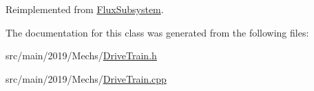 Reimplemented from \hyperlink{classFluxSubsystem_a327d76affc60699bfa62563e364e42f5}{Flux\+Subsystem}.



The documentation for this class was generated from the following files\+:\begin{DoxyCompactItemize}
\item 
src/main/2019/\+Mechs/\hyperlink{DriveTrain_8h}{Drive\+Train.\+h}\item 
src/main/2019/\+Mechs/\hyperlink{DriveTrain_8cpp}{Drive\+Train.\+cpp}\end{DoxyCompactItemize}
